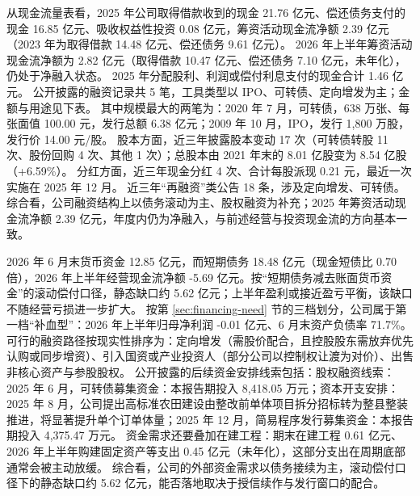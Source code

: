  从现金流量表看，2025 年公司取得借款收到的现金 21.76 亿元、偿还债务支付的现金 16.85 亿元、吸收权益性投资 0.08 亿元，筹资活动现金流净额 2.39 亿元（2023 年为取得借款 14.48 亿元、偿还债务 9.61 亿元）。 2026 年上半年筹资活动现金流净额为 2.82 亿元（取得借款 10.47 亿元、偿还债务 7.10 亿元，未年化），仍处于净融入状态。 2025 年分配股利、利润或偿付利息支付的现金合计 1.46 亿元。 公开披露的融资记录共 5 笔，工具类型以 IPO、可转债、定向增发为主；金额与用途见下表。 其中规模最大的两笔为：2020 年 7 月，可转债，638 万张、每张面值 100.00 元，发行总额 6.38 亿元；2009 年 10 月，IPO，发行 1,800 万股，发行价 14.00 元/股。 股本方面，近三年披露股本变动 17 次（可转债转股 11 次、股份回购 4 次、其他 1 次）；总股本由 2021 年末的 8.01 亿股变为 8.54 亿股（+6.59\%）。 分红方面，近三年现金分红 4 次、合计每股派现 0.21 元，最近一次实施在 2025 年 12 月。 近三年“再融资”类公告 18 条，涉及定向增发、可转债。 综合看，公司融资结构上以债务滚动为主、股权融资为补充；2025 年筹资活动现金流净额 2.39 亿元，年度内仍为净融入，与前述经营与投资现金流的方向基本一致。

 2026 年 6 月末货币资金 12.85 亿元，而短期债务 18.48 亿元（现金短债比 0.70 倍），2026 年上半年经营现金流净额 -5.69 亿元。按“短期债务减去账面货币资金”的滚动偿付口径，静态缺口约 5.62 亿元；上半年盈利或接近盈亏平衡，该缺口不随经营亏损进一步扩大。 按第 \ref{sec:financing-need} 节的三档划分，公司属于第一档“补血型”：2026 年上半年归母净利润 -0.01 亿元、6 月末资产负债率 71.7\%。 可行的融资路径按现实性排序为：定向增发（需股价配合，且控股股东需放弃优先认购或同步增资）、引入国资或产业投资人（部分公司以控制权让渡为对价）、出售非核心资产与参股股权。 公开披露的后续资金安排线索包括：股权融资线索：2025 年 6 月，可转债募集资金：本报告期投入 8,418.05 万元；资本开支安排：2025 年 8 月，公司提出高标准农田建设由整改前单体项目拆分招标转为整县整装推进，将显著提升单个订单体量；2025 年 12 月，简易程序发行募集资金：本报告期投入 4,375.47 万元。 资金需求还要叠加在建工程：期末在建工程 0.61 亿元、2026 年上半年购建固定资产等支出 0.45 亿元（未年化），这部分支出在周期底部通常会被主动放缓。 综合看，公司的外部资金需求以债务接续为主，滚动偿付口径下的静态缺口约 5.62 亿元，能否落地取决于授信续作与发行窗口的配合。




